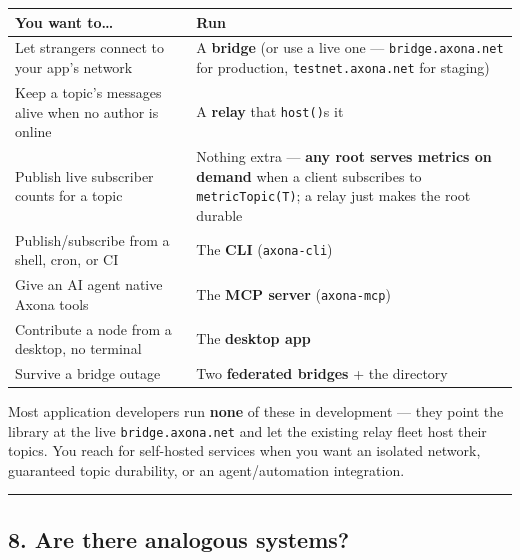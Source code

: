 \documentclass[
  nobib]{tufte-handout}
\newcounter{none} %
\begin{document}
{\def\LTcaptype{none} %
\begin{longtable}[]{@{}
  >{\raggedright\arraybackslash}p{}
  >{\raggedright\arraybackslash}p{}@{}}
\toprule\noalign{}
\begin{minipage}[b]{\linewidth}\raggedright
You want to\ldots{}
\end{minipage} & \begin{minipage}[b]{\linewidth}\raggedright
Run
\end{minipage} \\
\midrule\noalign{}
\endhead
\bottomrule\noalign{}
\endlastfoot
Let strangers connect to your app's network & A \textbf{bridge} (or use
a live one --- \texttt{bridge.axona.net} for production,
\texttt{testnet.axona.net} for staging) \\
Keep a topic's messages alive when no author is online & A
\textbf{relay} that \texttt{host()}s it \\
Publish live subscriber counts for a topic & Nothing extra ---
\textbf{any root serves metrics on demand} when a client subscribes to
\texttt{metricTopic(T)}; a relay just makes the root durable \\
Publish/subscribe from a shell, cron, or CI & The \textbf{CLI}
(\texttt{axona-cli}) \\
Give an AI agent native Axona tools & The \textbf{MCP server}
(\texttt{axona-mcp}) \\
Contribute a node from a desktop, no terminal & The \textbf{desktop
app} \\
Survive a bridge outage & Two \textbf{federated bridges} + the
directory \\
\end{longtable}
}

Most application developers run \textbf{none} of these in development
--- they point the library at the live \texttt{bridge.axona.net} and let
the existing relay fleet host their topics. You reach for self-hosted
services when you want an isolated network, guaranteed topic durability,
or an agent/automation integration.

\begin{center}\rule{0.5\linewidth}{0.5pt}\end{center}

\subsection{8. Are there analogous
systems?}\label{are-there-analogous-systems}
\end{document}
